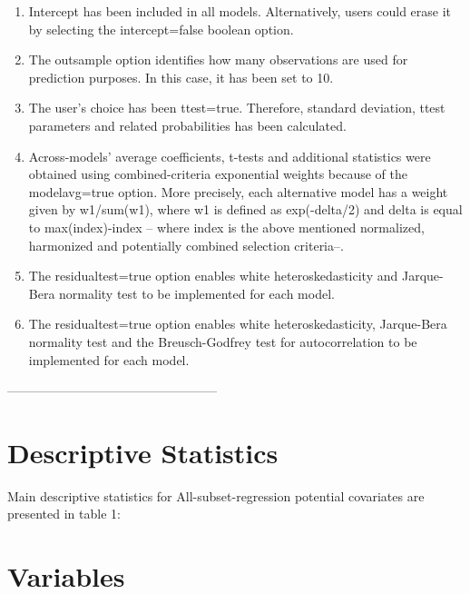 \documentclass{article}
\begin{document}
\begin{enumerate}
  \item Intercept has been included in all models. Alternatively, users could erase it by selecting the intercept=false boolean option.
  \item The outsample option identifies how many observations are used for prediction purposes. In this case, it has been set to 10.
  \item The user's choice has been ttest=true. Therefore, standard deviation, ttest parameters and related probabilities has been calculated.
  \item Across-models' average coefficients, t-tests and additional statistics were obtained using combined-criteria exponential weights because of the modelavg=true option. More precisely, each alternative model has a weight given by w1/sum(w1), where w1 is defined as exp(-delta/2) and delta is equal to max(index)-index -- where index is the above mentioned normalized, harmonized and potentially combined selection criteria--.
  \item The residualtest=true option enables white heteroskedasticity and Jarque-Bera normality test to be implemented for each model.
  \item The residualtest=true option enables white heteroskedasticity, Jarque-Bera normality test and the Breusch-Godfrey test for autocorrelation to be implemented for each model.
\end{enumerate}

--------------------------------------------------


\section{Descriptive Statistics}

Main descriptive statistics for All-subset-regression potential covariates are presented in table 1:

\clearpage

\section{Variables}
\end{document}
